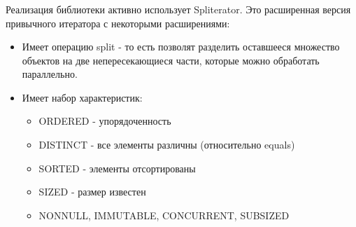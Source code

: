 \begin{frame}
\frametitle{\insertsection} 
\framesubtitle{\insertsubsection}
Реализация библиотеки активно использует Spliterator. Это расширенная версия привычного итератора с некоторыми расширениями:
\begin{itemize}
	\item Имеет операцию split - то есть позволят разделить оставшееся множество объектов на две непересекающиеся части, которые можно обработать параллельно.
	\item Имеет набор характеристик:
	\begin{itemize}
		\item ORDERED - упорядоченность
		\item DISTINCT - все элементы различны (относительно equals)
		\item SORTED - элементы отсортированы
		\item SIZED - размер известен
		\item NONNULL, IMMUTABLE, CONCURRENT, SUBSIZED
	\end{itemize}
\end{itemize}
\end{frame}